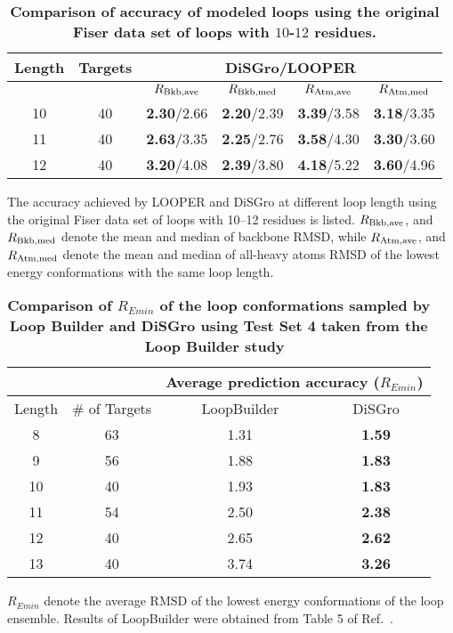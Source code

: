 \begin{table}[!h]
\caption{ \bf{Comparison of accuracy of modeled loops using the
original Fiser data set of loops with $10$-$12$ residues.}}
  \begin{tabular}{|c|c|c|c|c|c|}
    \cline{3-6}
    \hline
    Length &  Targets & \multicolumn{4}{c|}{{\bf {\sc DiSGro}}/LOOPER}\\
    \hline
    & & $R_{\rm Bkb,ave}$ & $R_{\rm Bkb,med}$ & $R_{\rm Atm,ave}$ & $R_{\rm Atm,med}$\\
    \hline
    10 & 40 & {\bf 2.30}/2.66 & {\bf 2.20}/2.39 & {\bf 3.39}/3.58 & {\bf 3.18}/3.35\\
    11 & 40 & {\bf 2.63}/3.35 & {\bf 2.25}/2.76 & {\bf 3.58}/4.30 & {\bf 3.30}/3.60\\
    12 & 40 & {\bf 3.20}/4.08 & {\bf 2.39}/3.80 & {\bf 4.18}/5.22 & {\bf 3.60}/4.96\\
    \hline
  \end{tabular}
  \begin{flushleft} The accuracy achieved by LOOPER and {\sc DiSGro} at different loop length using
the original Fiser data set of loops with 10--12 residues is listed.
$R_{\rm Bkb,ave}$, and $R_{\rm Bkb,med}$ denote the mean and median
of backbone RMSD, while $R_{\rm Atm,ave}$, and $R_{\rm Atm,med}$
denote the mean and median of all-heavy atoms RMSD of the lowest
energy conformations with the same loop length.
\end{flushleft}
\label{tab:looper}
\end{table}
\begin{table}[!h]
\caption{ \bf{Comparison of $R_{Emin}$ of the loop conformations
sampled by Loop Builder and {\sc DiSGro} using Test Set 4 taken from
the Loop Builder study~\cite{soto2008}}}
\begin{tabular}{|c|c| c | c |}
\hline \cline{1-4}
 &   & \multicolumn{2}{c|}{Average prediction accuracy ($R_{Emin}$)}\\
\hline
   Length & \# of Targets & LoopBuilder & {\sc DiSGro} \\
\hline
      8 & 63 & 1.31 & \textbf{1.59}\\
      9 & 56 & 1.88 & \textbf{1.83}\\
     10 & 40 & 1.93 & \textbf{1.83}\\
     11 & 54 & 2.50 & \textbf{2.38}\\
     12 & 40 & 2.65 & \textbf{2.62}\\
     13 & 40 & 3.74 & \textbf{3.26}\\
\hline
\end{tabular}
\begin{flushleft}$R_{Emin}$ denote the
average RMSD of the lowest energy conformations of the loop
ensemble.
Results of LoopBuilder were obtained from Table 5 of
Ref.~\cite{soto2008}.
\end{flushleft}
\label{tab:sotobuilderE}
\end{table}
